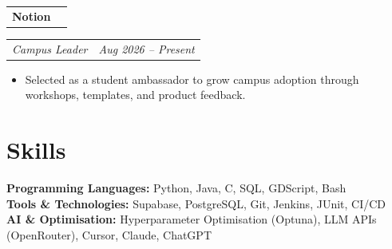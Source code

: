 \documentclass[10pt,a4paper]{article}
\makeatletter
\newcommand{\organisation}[2]{%
  \vspace{3pt}
  \begin{tabularx}{\textwidth}{@{}Xr@{}}
    \textbf{#1} & \textbf{#2}
  \end{tabularx}\vspace{-1pt}
}
\newcommand{\role}[2]{%
  \begin{tabularx}{\textwidth}{@{}Xr@{}}
    \textit{#1} & \textit{#2}
  \end{tabularx}\vspace{-1pt}
}
\makeatother
\begin{document}
\vspace{2pt}
\organisation{Notion}{}
\role{Campus Leader}{Aug 2026 -- Present}
\begin{itemize}
  \item Selected as a student ambassador to grow campus adoption through workshops, templates, and product feedback.
\end{itemize}

\section{Skills}
\textbf{Programming Languages:} Python, Java, C, SQL, GDScript, Bash\\
\textbf{Tools \& Technologies:} Supabase, PostgreSQL, Git, Jenkins, JUnit, CI/CD\\
\textbf{AI \& Optimisation:} Hyperparameter Optimisation (Optuna), LLM APIs (OpenRouter), Cursor, Claude, ChatGPT
\end{document}
